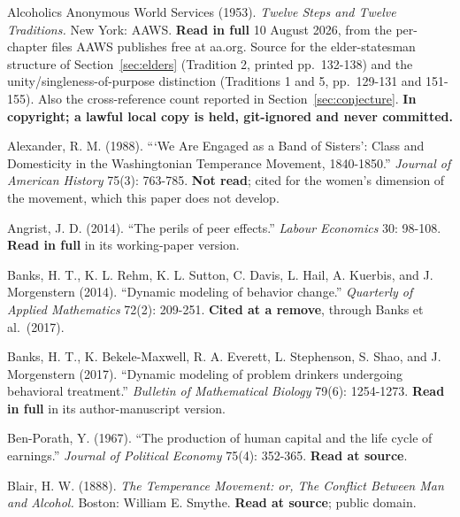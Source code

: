 \documentclass[11pt,a4paper]{article}
\begin{document}
\begin{list}{}{\setlength{\leftmargin}{1.5em}\setlength{\itemindent}{-1.5em}\setlength{\itemsep}{2pt}}\small

\item Alcoholics Anonymous World Services (1953). \textit{Twelve Steps and Twelve Traditions.} New York: AAWS. \textbf{Read in full} 10 August 2026, from the per-chapter files AAWS publishes free at aa.org. Source for the elder-statesman structure of Section~\ref{sec:elders} (Tradition 2, printed pp.\ 132-138) and the unity/singleness-of-purpose distinction (Traditions 1 and 5, pp.\ 129-131 and 151-155). Also the cross-reference count reported in Section~\ref{sec:conjecture}. \textbf{In copyright; a lawful local copy is held, git-ignored and never committed.}

\item Alexander, R. M. (1988). ```We Are Engaged as a Band of Sisters': Class and Domesticity in the Washingtonian Temperance Movement, 1840-1850.'' \textit{Journal of American History} 75(3): 763-785. \textbf{Not read}; cited for the women's dimension of the movement, which this paper does not develop.

\item Angrist, J. D. (2014). ``The perils of peer effects.'' \textit{Labour Economics} 30: 98-108. \textbf{Read in full} in its working-paper version.

\item Banks, H. T., K. L. Rehm, K. L. Sutton, C. Davis, L. Hail, A. Kuerbis, and J. Morgenstern (2014). ``Dynamic modeling of behavior change.'' \textit{Quarterly of Applied Mathematics} 72(2): 209-251. \textbf{Cited at a remove}, through Banks et al.\ (2017).

\item Banks, H. T., K. Bekele-Maxwell, R. A. Everett, L. Stephenson, S. Shao, and J. Morgenstern (2017). ``Dynamic modeling of problem drinkers undergoing behavioral treatment.'' \textit{Bulletin of Mathematical Biology} 79(6): 1254-1273. \textbf{Read in full} in its author-manuscript version.

\item Ben-Porath, Y. (1967). ``The production of human capital and the life cycle of earnings.'' \textit{Journal of Political Economy} 75(4): 352-365. \textbf{Read at source}.

\item Blair, H. W. (1888). \textit{The Temperance Movement: or, The Conflict Between Man and Alcohol.} Boston: William E. Smythe. \textbf{Read at source}; public domain.


\end{list}
\end{document}
